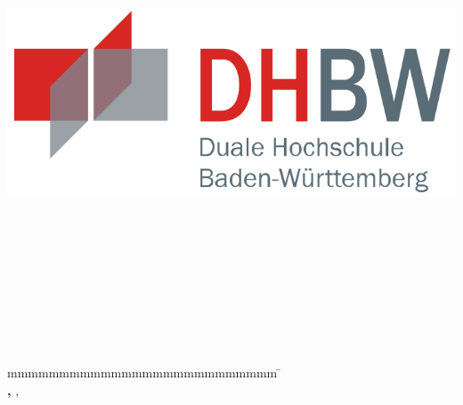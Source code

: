 
\begin{titlepage}
	\begin{center}
		\includegraphics[height=0.1\textwidth]{data/images/dhbw.png}
	\end{center}

	\enlargethispage{15mm}
	\begin{center}
		\vspace*{10mm}	{\LARGE\textbf \titel \par}
		\vspace*{10mm}	{\large\textbf \arbeit}\\
		\vspace*{10mm}	\langdeckblattabschlusshinleitung\\
		\vspace*{3mm}		{\textbf \abschluss}\\
		\vspace*{10mm}	\langartikelstudiengang{} \langstudiengang{} \studiengang\\
		\vspace*{3mm}		\langanderdh{} \dhbw\\
		\vspace*{10mm}	\langvon\\
		\vspace*{3mm}		{\large\textbf \autor}\\
		\vspace*{10mm}	\datumAbgabe\\
		\vspace*{10mm}
	\end{center}
	\vfill
	\begin{spacing}{1.2}
		\begin{tabbing}
			mmmmmmmmmmmmmmmmmmmmmmmmmm             \= \kill
			\textbf{\langdbbearbeitungszeit}       \>  \zeitraum\\
			\textbf{\langdbmatriknr, \langdbkurs}  \>  \martrikelnr, \kurs\\
			\textbf{\langdbbetreuer}               \>  \betreuer\\
		\end{tabbing}
	\end{spacing}
\end{titlepage}
